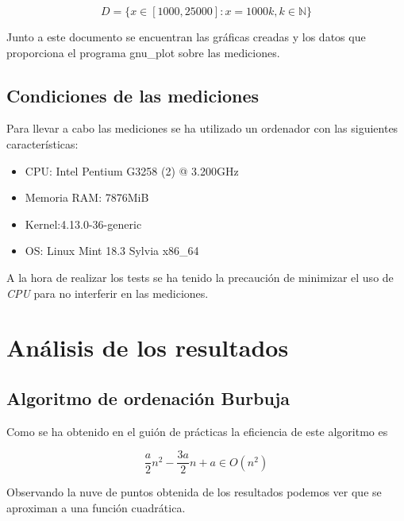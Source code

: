 \documentclass{article}
\begin{document}
$$D = \{x \in [1000, 25000]: x = 1000k, k \in \mathbb{N}\}$$

Junto a este documento se encuentran las gráficas creadas y los datos
que proporciona el programa gnu_plot sobre las mediciones.

\subsection{Condiciones de las mediciones}

Para llevar a cabo las mediciones se ha utilizado un ordenador con las siguientes características:

\begin{itemize}
\item CPU: Intel Pentium G3258 (2) @ 3.200GHz
\item Memoria RAM: 7876MiB
\item Kernel:4.13.0-36-generic
\item OS: Linux Mint 18.3 Sylvia x86\_64
\end{itemize}

A la hora de realizar los tests se ha tenido la precaución de
minimizar el uso de \textit{CPU} para no interferir en las mediciones.

\section{Análisis de los resultados}

\subsection{Algoritmo de ordenación Burbuja}

Como se ha obtenido en el guión de prácticas la eficiencia de este algoritmo es

$$ \frac{a}{2}n^2 - \frac{3a}{2}n + a \in O(n^2)$$

Observando la nuve de puntos obtenida de los resultados podemos ver
que se aproximan a una función cuadrática.
\end{document}

